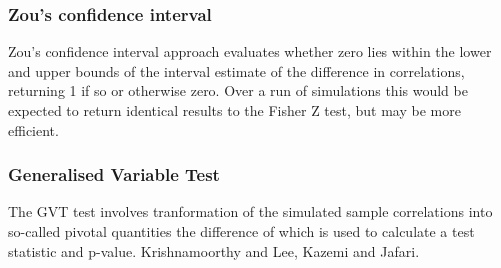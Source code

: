 \subsubsection{Zou's confidence interval}
Zou's confidence interval approach evaluates whether zero lies within the lower and upper bounds of the interval estimate of the difference in correlations, returning 1 if so or otherwise zero.  Over a run of simulations this would be expected to return identical results to the Fisher Z test, but may be more efficient.
\subsubsection{Generalised Variable Test}

The GVT test involves tranformation of the simulated sample correlations into so-called pivotal quantities the difference of which is used to calculate a test statistic and p-value.  Krishnamoorthy and Lee, Kazemi and Jafari.
  
  
  
  
